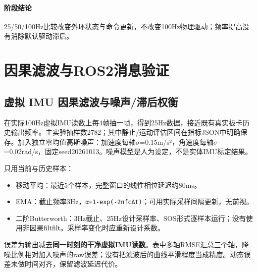 \paragraph{阶段结论}25/50/100Hz比较改变外环状态与命令更新，不改变100Hz物理驱动；频率提高没有消除默认驱动滞后。


\FloatBarrier

\section{因果滤波与ROS2消息验证}

\label{stage:s06}

\subsection{虚拟 IMU 因果滤波与噪声/滞后权衡}\label{s06-detail-1}

在实际100Hz虚拟IMU读数上每4帧抽一帧，得到25Hz数据，接近既有真实板卡历史输出频率。主实验抽样数2782；其中静止/运动评估区间在指标JSON中明确保存。加入独立零均值高斯噪声：加速度每轴\(\sigma\)=0.15m/s²，角速度每轴\(\sigma\)=0.02rad/s，固定seed20261013。噪声模型是人为设定，不是实体IMU标定结果。

只用当前与历史样本：

\begin{itemize}
\tightlist
\item
  移动平均：最近5个样本，完整窗口的线性相位延迟约80ms。
\item
  EMA：截止频率3Hz，\texttt{α=1-exp(-2πfcΔt)}；可用实际采样间隔更新，无前视。
\item
  二阶Butterworth：3Hz截止、25Hz设计采样率、SOS形式逐样本运行；没有使用非因果filtfilt。采样率变化时应重新设计系数。
\end{itemize}

误差为输出减去\textbf{同一时刻的干净虚拟IMU读数}。表中多轴RMSE汇总三个轴，降噪比例相对加入噪声的raw误差；没有把滤波后的曲线平滑程度当成精度。动态误差未做时间对齐，保留滤波延迟代价。

